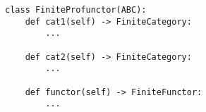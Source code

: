 \begin{verbatim}
class FiniteProfunctor(ABC):
    def cat1(self) -> FiniteCategory:
        ...

    def cat2(self) -> FiniteCategory:
        ...

    def functor(self) -> FiniteFunctor:
        ...
\end{verbatim}
